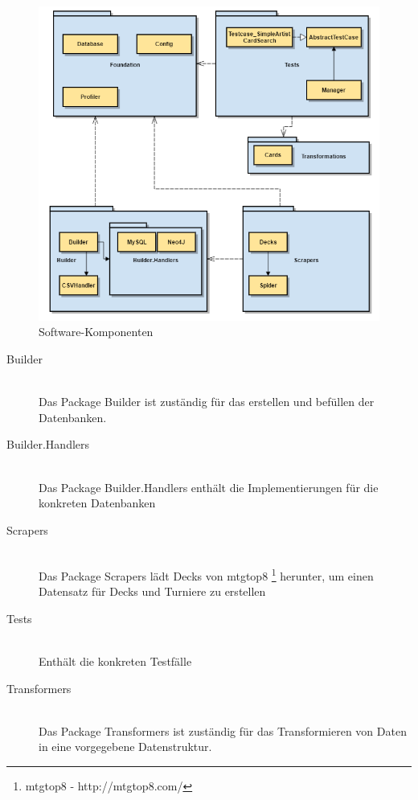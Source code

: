 \begin{figure}[H]
    \myfloatalign
    \includegraphics[width=\textwidth]{gfx/sw-components.png}
    \caption{Software-Komponenten}
    \label{fig:sw-components}
\end{figure}
\begin{description}
    \item[Builder] \hfill \\
        Das Package Builder ist zuständig für das erstellen und befüllen der Datenbanken.
    
    \item[Builder.Handlers]  \hfill \\
        Das Package Builder.Handlers enthält die Implementierungen für die konkreten Datenbanken
    
    \item[Scrapers]  \hfill \\
         Das Package Scrapers lädt Decks von mtgtop8 \footnote{mtgtop8 - http://mtgtop8.com/} herunter, um einen Datensatz für Decks und Turniere zu erstellen
    
    \item[Tests]  \hfill \\
        Enthält die konkreten Testfälle
    
    \item[Transformers]  \hfill \\
        Das Package Transformers ist zuständig für das Transformieren von Daten in eine vorgegebene Datenstruktur.
\end{description}

